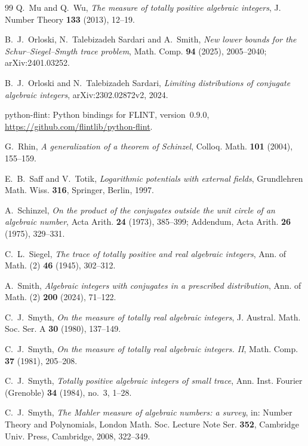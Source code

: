 \documentclass[11pt]{amsart}
\theoremstyle{remark}
\numberwithin{equation}{section}
\begin{document}
\begin{thebibliography}{99}
 Q.~Mu and Q.~Wu, \emph{The measure of totally positive algebraic integers}, J. Number Theory \textbf{133} (2013), 12--19.


 B.~J.~Orloski, N.~Talebizadeh Sardari and A.~Smith, \emph{New lower bounds for the Schur--Siegel--Smyth trace problem}, Math. Comp. \textbf{94} (2025), 2005--2040; arXiv:2401.03252.

 B.~J.~Orloski and N.~Talebizadeh Sardari, \emph{Limiting distributions of conjugate algebraic integers}, arXiv:2302.02872v2, 2024.

 python-flint: Python bindings for FLINT, version~0.9.0, \url{https://github.com/flintlib/python-flint}.

 G.~Rhin, \emph{A generalization of a theorem of Schinzel}, Colloq. Math. \textbf{101} (2004), 155--159.

 E.~B.~Saff and V.~Totik, \emph{Logarithmic potentials with external fields}, Grundlehren Math. Wiss. \textbf{316}, Springer, Berlin, 1997.

 A.~Schinzel, \emph{On the product of the conjugates outside the unit circle of an algebraic number}, Acta Arith. \textbf{24} (1973), 385--399; Addendum, Acta Arith. \textbf{26} (1975), 329--331.

 C.~L.~Siegel, \emph{The trace of totally positive and real algebraic integers}, Ann. of Math. (2) \textbf{46} (1945), 302--312.

 A.~Smith, \emph{Algebraic integers with conjugates in a prescribed distribution}, Ann. of Math. (2) \textbf{200} (2024), 71--122.

 C.~J.~Smyth, \emph{On the measure of totally real algebraic integers}, J. Austral. Math. Soc. Ser. A \textbf{30} (1980), 137--149.

 C.~J.~Smyth, \emph{On the measure of totally real algebraic integers. II}, Math. Comp. \textbf{37} (1981), 205--208.

 C.~J.~Smyth, \emph{Totally positive algebraic integers of small trace}, Ann. Inst. Fourier (Grenoble) \textbf{34} (1984), no.~3, 1--28.

 C.~J.~Smyth, \emph{The Mahler measure of algebraic numbers: a survey}, in: Number Theory and Polynomials, London Math. Soc. Lecture Note Ser. \textbf{352}, Cambridge Univ. Press, Cambridge, 2008, 322--349.

\end{thebibliography}
\end{document}
